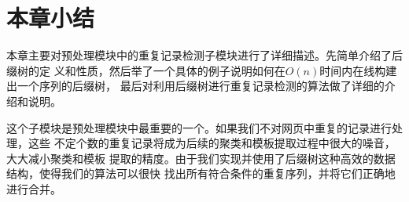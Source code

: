 \section{本章小结}
\label{sec:summarysuffixtree}
本章主要对预处理模块中的重复记录检测子模块进行了详细描述。先简单介绍了后缀树的定
义和性质，然后举了一个具体的例子说明如何在$O(n)$时间内在线构建出一个序列的后缀树，
最后对利用后缀树进行重复记录检测的算法做了详细的介绍和说明。

这个子模块是预处理模块中最重要的一个。如果我们不对网页中重复的记录进行处理，这些
不定个数的重复记录将成为后续的聚类和模板提取过程中很大的噪音，大大减小聚类和模板
提取的精度。由于我们实现并使用了后缀树这种高效的数据结构，使得我们的算法可以很快
找出所有符合条件的重复序列，并将它们正确地进行合并。

